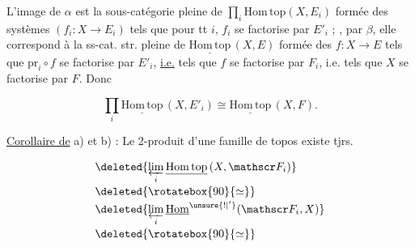 L'image  de $\alpha$ est la sous-catégorie  pleine de $\prod_i\mathrm{Hom\,top}(X,E_i)$ formée des systèmes $(f_i\colon X\longrightarrow E_i)$ tels que pour tt $i$, $f_i$ se factorise par $E'_i$ ;  ,  par $\beta$, elle correspond à la ss-cat. str. pleine de $\underline{\mathrm{Hom\,top}}\,(X,E)$ formée des $f\colon X\longrightarrow E$ tels que  $\mathrm{pr}_i\circ f$ se factorise par $E'_i$, \uline{i.e.} tels que  $f$ se factorise par $F_i$, i.e. tels que $X$ se factorise par $F$. Donc

\[
\prod_i\underline{\mathrm{Hom\,top}}\,(X,E'_i)\cong\underline{\mathrm{Hom\,top}}\,(X,F).
\]

\uline{Corollaire de} a) et b) : Le 2-produit d'une famille de topos existe tjrs.



\[
\begin{aligned}
&\deleted{\varprojlim_i\underline{\mathrm{Hom\,top}}\,(X,\mathscr F_i)}\\[-2pt]
&\deleted{\rotatebox{90}{\ensuremath{\simeq}}}\\[-2pt]
&\deleted{\varprojlim_i\underline{\mathrm{Hom}}^{\unsure{!|'}}(\mathscr F_i,X)}\\[-2pt]
&\deleted{\rotatebox{90}{\ensuremath{\simeq}}}
\end{aligned}
\]


